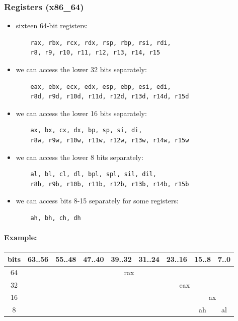 \documentclass[12pt]{article}
\begin{document}
\subsubsection{Registers (x86\_64)}

\begin{itemize}
    \item sixteen 64-bit registers:
    \begin{lstlisting}
    rax, rbx, rcx, rdx, rsp, rbp, rsi, rdi,
    r8, r9, r10, r11, r12, r13, r14, r15
    \end{lstlisting}
    
    \item we can access the lower 32 bits separately:
    \begin{lstlisting}
    eax, ebx, ecx, edx, esp, ebp, esi, edi,
    r8d, r9d, r10d, r11d, r12d, r13d, r14d, r15d
    \end{lstlisting}
    
    \item we can access the lower 16 bits separately:
    \begin{lstlisting}
    ax, bx, cx, dx, bp, sp, si, di,
    r8w, r9w, r10w, r11w, r12w, r13w, r14w, r15w
    \end{lstlisting}
    
    \item we can access the lower 8 bits separately:
    \begin{lstlisting}
    al, bl, cl, dl, bpl, spl, sil, dil,
    r8b, r9b, r10b, r11b, r12b, r13b, r14b, r15b
    \end{lstlisting}
    
    \item we can access bits 8-15 separately for some registers:
    \begin{lstlisting}
    ah, bh, ch, dh
    \end{lstlisting}
\end{itemize}

\paragraph{Example:}
\begin{tabular}{|c|c|c|c|c|c|c|c|c|}
\hline
\textbf{bits} & \textbf{63..56} & \textbf{55..48} & \textbf{47..40} & \textbf{39..32} & \textbf{31..24} & \textbf{23..16} & \textbf{15..8} & \textbf{7..0} \\
\hline
64 & \multicolumn{8}{c|}{rax} \\
\hline
32 & \multicolumn{4}{c|}{} & \multicolumn{4}{c|}{eax} \\
\hline
16 &  &  &  &  &  & & \multicolumn{2}{c|}{ax} \\
\hline
8 &  &  &  &  &  &  & ah & al \\
\hline
\end{tabular}
\end{document}
